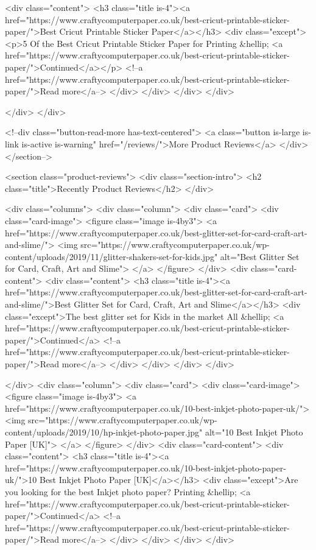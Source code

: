           <div class="content">
            <h3 class="title is-4"><a href="https://www.craftycomputerpaper.co.uk/best-cricut-printable-sticker-paper/">Best Cricut Printable Sticker Paper</a></h3>
            <div class="except"><p>5 Of the Best Cricut Printable Sticker Paper for Printing &hellip; <a href="https://www.craftycomputerpaper.co.uk/best-cricut-printable-sticker-paper/">Continued</a></p>
 <!--a href="https://www.craftycomputerpaper.co.uk/best-cricut-printable-sticker-paper/">Read more</a--> </div>
          </div>
        </div>
      </div>

    </div>
  </div>

  <!--div class="button-read-more has-text-centered">
    <a class="button is-large is-link is-active is-warning" href="/reviews/">More Product Reviews</a>
  </div>
</section-->

<section class="product-reviews">
  <div class="section-intro">
    <h2 class="title">Recently Product Reviews</h2>
  </div>

  <div class="columns">
      <div class="column">
      <div class="card">
        <div class="card-image">
          <figure class="image is-4by3">
          <a href="https://www.craftycomputerpaper.co.uk/best-glitter-set-for-card-craft-art-and-slime/">
                          <img src="https://www.craftycomputerpaper.co.uk/wp-content/uploads/2019/11/glitter-shakers-set-for-kids.jpg" alt="Best Glitter Set for Card, Craft, Art and Slime">
                      </a>
          </figure>
        </div>
        <div class="card-content">
          <div class="content">
            <h3 class="title is-4"><a href="https://www.craftycomputerpaper.co.uk/best-glitter-set-for-card-craft-art-and-slime/">Best Glitter Set for Card, Craft, Art and Slime</a></h3>
            <div class="except">The best glitter set for Kids in the market All &hellip; <a href="https://www.craftycomputerpaper.co.uk/best-cricut-printable-sticker-paper/">Continued</a> <!--a href="https://www.craftycomputerpaper.co.uk/best-cricut-printable-sticker-paper/">Read more</a--> </div>
          </div>
        </div>
      </div>

    </div>
      <div class="column">
      <div class="card">
        <div class="card-image">
          <figure class="image is-4by3">
          <a href="https://www.craftycomputerpaper.co.uk/10-best-inkjet-photo-paper-uk/">
                          <img src="https://www.craftycomputerpaper.co.uk/wp-content/uploads/2019/10/hp-inkjet-photo-paper.jpg" alt="10 Best Inkjet Photo Paper [UK]">
                      </a>
          </figure>
        </div>
        <div class="card-content">
          <div class="content">
            <h3 class="title is-4"><a href="https://www.craftycomputerpaper.co.uk/10-best-inkjet-photo-paper-uk/">10 Best Inkjet Photo Paper [UK]</a></h3>
            <div class="except">Are you looking for the best Inkjet photo paper? Printing &hellip; <a href="https://www.craftycomputerpaper.co.uk/best-cricut-printable-sticker-paper/">Continued</a> <!--a href="https://www.craftycomputerpaper.co.uk/best-cricut-printable-sticker-paper/">Read more</a--> </div>
          </div>
        </div>
      </div>

